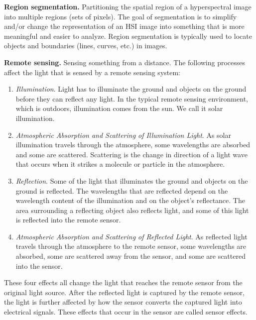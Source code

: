 \textbf{Region segmentation.} Partitioning the spatial region of a
hyperspectral image into multiple regions (sets of pixels). The goal of
segmentation is to simplify and/or change the representation of an HSI image
into something that is more meaningful and easier to analyze. Region
segmentation is typically used to locate objects and boundaries (lines,
curves, etc.) in images.%

\textbf{Remote sensing.} Sensing something from a distance. The following
processes affect the light that is sensed by a remote sensing system:


\begin{enumerate}
\item \emph{Illumination}. Light has to illuminate the ground and objects on
the ground before they can reflect any light. In the typical remote sensing
environment, which is outdoors, illumination comes from the sun. We call it
solar illumination.

\item \emph{Atmospheric Absorption and Scattering of Illumination Light}. As
solar illumination travels through the atmosphere, some wavelengths are
absorbed and some are scattered. Scattering is the change in direction of a
light wave that occurs when it strikes a molecule or particle in the atmosphere.

\item \emph{Reflection}. Some of the light that illuminates the ground and
objects on the ground is reflected. The wavelengths that are reflected depend
on the wavelength content of the illumination and on the object's reflectance.
The area surrounding a reflecting object also reflects light, and some of this
light is reflected into the remote sensor.

\item \emph{Atmospheric Absorption and Scattering of Reflected Light}. As
reflected light travels through the atmosphere to the remote sensor, some
wavelengths are absorbed, some are scattered away from the sensor, and some
are scattered into the sensor.
\end{enumerate}

These four effects all change the light that reaches the remote sensor from
the original light source. After the reflected light is captured by the remote
sensor, the light is further affected by how the sensor converts the captured
light into electrical signals. These effects that occur in the sensor are
called sensor effects.

